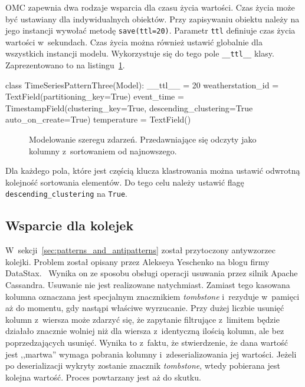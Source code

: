 OMC zapewnia dwa rodzaje wsparcia dla czasu życia wartości. Czas życia może być ustawiany dla indywidualnych obiektów. Przy zapisywaniu obiektu należy na jego instancji wywołać metodę \verb+save(ttl=20)+. Parametr \verb+ttl+ definiuje czas życia wartości w~sekundach. Czas życia można również ustawić globalnie dla wszystkich instancji modelu. Wykorzystuje się do tego pole \verb+__ttl__+ klasy. Zaprezentowano to na listingu~\ref{lst:time_series_modeling_three}.

\begin{verbbox}[\footnotesize]
class TimeSeriesPatternThree(Model):
    __ttl__ = 20
    weatherstation_id = TextField(partitioning_key=True)
    event_time = TimestampField(clustering_key=True, 
                                descending_clustering=True
                                auto_on_create=True)
    temperature = TextField()
\end{verbbox}

\begin{figure}[ht!]
	\centering
	\theverbbox
	\caption{Modelowanie szeregu zdarzeń. Przedawniające się odczyty jako kolumny z~sortowaniem od najnowszego.}
	\label{lst:time_series_modeling_three}
\end{figure} 

Dla każdego pola, które jest częścią klucza klastrowania można ustawić odwrotną kolejność sortowania elementów. Do tego celu należy ustawić flagę \verb+descending_clustering+ na \verb+True+.

\subsection{Wsparcie dla kolejek}

W~sekcji~\ref{sec:patterns_and_antipatterns} został przytoczony antywzorzec kolejki. Problem został opisany przez Alekseya Yeschenko na blogu firmy DataStax.~\cite{cassandra_queue_antipattern} Wynika on ze sposobu obsługi operacji usuwania przez silnik Apache Cassandra. Usuwanie nie jest realizowane natychmiast. Zamiast tego kasowana kolumna oznaczana jest specjalnym znacznikiem \emph{tombstone} i~rezyduje w~pamięci aż do momentu, gdy nastąpi właściwe wyrzucanie. Przy dużej liczbie usunięć kolumn z~wiersza może zdarzyć się, że zapytanie filtrujące z~limitem będzie działało znacznie wolniej niż dla wiersza z~identyczną ilością kolumn, ale bez poprzedzających usunięć. Wynika to z~faktu, że stwierdzenie, że dana wartość jest ,,martwa'' wymaga pobrania kolumny i~zdeserializowania jej wartości. Jeżeli po deserializacji wykryty zostanie znacznik \emph{tombstone}, wtedy pobierana jest kolejna wartość. Proces powtarzany jest aż do skutku.

